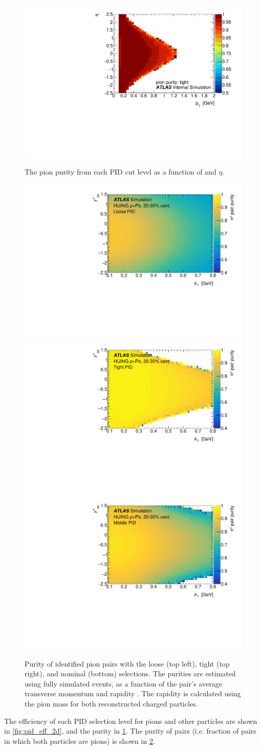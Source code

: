 \begin{figure}[t]
\begin{minipage}[t]{1.0\textwidth}
\includegraphics[width=.49\linewidth]{pid_pur_tight.pdf}\\
\end{minipage}
\caption{The pion purity from each PID cut level as a function of \pt and $\eta$.}
\label{fig:pid_purity_2d}
\end{figure}


\begin{figure}[t]
\centering
\includegraphics[width=.49\linewidth]{pid_pur_loose_kt_eta.pdf}
\includegraphics[width=.49\linewidth]{pid_pur_tight_kt_eta.pdf}\\
\includegraphics[width=.6\linewidth]{pid_pur_mid_kt_eta.pdf}\\
\caption{Purity of identified pion pairs with the loose (top left), tight (top right), and nominal (bottom) \pid selections. The purities are estimated using fully simulated \Hijing \pPb events, as a function of the pair's average transverse momentum \kt and rapidity \kys. The rapidity is calculated using the pion mass for both reconstructed charged particles.}
\label{fig:pid_purity_kt_eta}
\end{figure}

The efficiency of each PID selection level for pions and other particles are shown in \cref{fig:pid_eff_2d}, and the purity in \cref{fig:pid_purity_2d}.
The purity of pairs (i.e. fraction of pairs in which both particles are pions) is shown in \cref{fig:pid_purity_kt_eta}.

